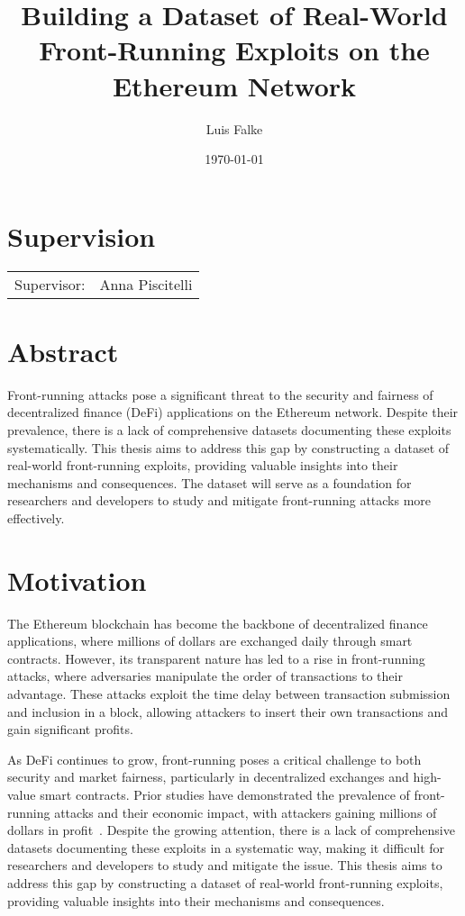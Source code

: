 \documentclass{scrartcl}
\title{Building a Dataset of Real-World Front-Running Exploits on the Ethereum Network}
\author{Luis Falke}
\date{\today}
\begin{document}
\maketitle

\section*{Supervision}

\begin{tabular}{ll}
    Supervisor: & Anna Piscitelli \\
\end{tabular}

\section*{Abstract}

Front-running attacks pose a significant threat to the security and fairness of decentralized finance (DeFi) applications on the Ethereum network. Despite their prevalence, there is a lack of comprehensive datasets documenting these exploits systematically. This thesis aims to address this gap by constructing a dataset of real-world front-running exploits, providing valuable insights into their mechanisms and consequences. The dataset will serve as a foundation for researchers and developers to study and mitigate front-running attacks more effectively.

\section*{Motivation}

The Ethereum blockchain has become the backbone of decentralized finance applications, where millions of dollars are exchanged daily through smart contracts. However, its transparent nature has led to a rise in front-running attacks, where adversaries manipulate the order of transactions to their advantage. These attacks exploit the time delay between transaction submission and inclusion in a block, allowing attackers to insert their own transactions and gain significant profits.

As DeFi continues to grow, front-running poses a critical challenge to both security and market fairness, particularly in decentralized exchanges and high-value smart contracts. Prior studies have demonstrated the prevalence of front-running attacks and their economic impact, with attackers gaining millions of dollars in profit~\cite{Perez21,Torres21}. Despite the growing attention, there is a lack of comprehensive datasets documenting these exploits in a systematic way, making it difficult for researchers and developers to study and mitigate the issue. This thesis aims to address this gap by constructing a dataset of real-world front-running exploits, providing valuable insights into their mechanisms and consequences.
\end{document}
